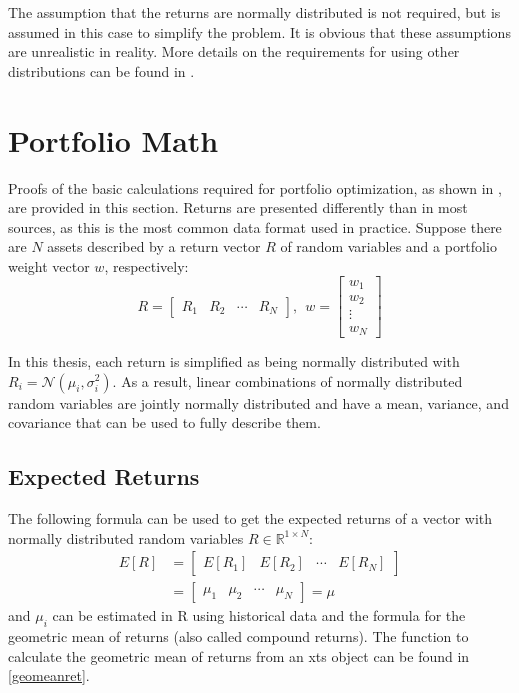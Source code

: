 \documentclass[
  oneside]{book}
\begin{document}
The assumption that the returns are normally distributed is not required, but is assumed in this case to simplify the problem. It is obvious that these assumptions are unrealistic in reality. More details on the requirements for using other distributions can be found in \citep{Mari2005}.

\hypertarget{portfolio-math}{%
\section{Portfolio Math}\label{portfolio-math}}

Proofs of the basic calculations required for portfolio optimization, as shown in \citep{Eric2021}, are provided in this section. Returns are presented differently than in most sources, as this is the most common data format used in practice. Suppose there are \(N\) assets described by a return vector \(R\) of random variables and a portfolio weight vector \(w\), respectively:
\[
  R = 
  \begin{bmatrix}
    R_{1} & R_{2} & \cdots & R_{N}  
 \end{bmatrix}
 , \ \ 
 w = 
  \begin{bmatrix}
    w_{1} \\ 
    w_{2} \\
    \vdots \\
    w_{N}  
 \end{bmatrix}
\]

In this thesis, each return is simplified as being normally distributed with \(R_i = \mathcal{N}(\mu_i, \sigma_i^2)\). As a result, linear combinations of normally distributed random variables are jointly normally distributed and have a mean, variance, and covariance that can be used to fully describe them.

\hypertarget{expected-returns}{%
\subsection{Expected Returns}\label{expected-returns}}

The following formula can be used to get the expected returns of a vector with normally distributed random variables \(R \in \mathbb{R}^{1\times N}\):
\begin{align*}
  E[R] &=
  \begin{bmatrix}
    E[R_{1}] & E[R_{2}] & \cdots & E[R_{N}]  
 \end{bmatrix}\\
 &=
 \begin{bmatrix}
    \mu_{1} & \mu_{2} & \cdots & \mu_{N} 
 \end{bmatrix}
 =
 \mu
\end{align*}
and \(\mu_i\) can be estimated in R using historical data and the formula for the geometric mean of returns (also called compound returns). The function to calculate the geometric mean of returns from an xts object can be found in \ref{geomeanret}.
\end{document}
